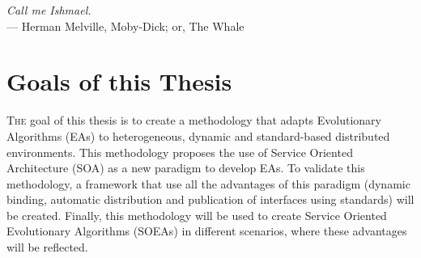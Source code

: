 \label{chap:introduction}
\begin{flushright}{\slshape
    Call me Ishmael.} \\ \medskip
    --- {Herman Melville, Moby-Dick; or, The Whale}
\end{flushright}
\minitoc\mtcskip
\vfill



\section{Goals of this Thesis} %


\lettrine{T}{he} goal of this thesis is to create a methodology that adapts Evolutionary Algorithms (EAs) to heterogeneous, dynamic and standard-based distributed environments. This methodology proposes the use of Service Oriented Architecture (SOA) as a new paradigm to develop EAs. To validate this methodology, a framework that use all the advantages of this paradigm (dynamic binding, automatic distribution and publication of interfaces using standards) will be created. Finally, this methodology will be used to create Service Oriented Evolutionary Algorithms (SOEAs) in different scenarios, where these advantages will be reflected.

